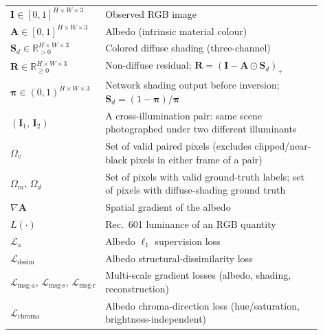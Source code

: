 \begin{longtable}{p{0.25\linewidth} p{0.65\linewidth}}

$\mathbf{I} \in [0,1]^{H \times W \times 3}$
  & Observed RGB image \\

$\mathbf{A} \in [0,1]^{H \times W \times 3}$
  & Albedo (intrinsic material colour) \\

$\mathbf{S}_d \in \mathbb{R}_{>0}^{H \times W \times 3}$
  & Colored diffuse shading (three-channel) \\

$\mathbf{R} \in \mathbb{R}_{\geq 0}^{H \times W \times 3}$
  & Non-diffuse residual; $\mathbf{R} = (\mathbf{I} - \mathbf{A} \odot \mathbf{S}_d)_{+}$ \\

$\boldsymbol{\pi} \in (0,1)^{H \times W \times 3}$
  & Network shading output before inversion; $\mathbf{S}_d = (1-\boldsymbol{\pi})/\boldsymbol{\pi}$ \\

$(\mathbf{I}_1,\, \mathbf{I}_2)$
  & A cross-illumination pair: same scene photographed under two different illuminants \\

$\Omega_v$
  & Set of valid paired pixels (excludes clipped/near-black pixels in either frame of a pair) \\

$\Omega_m,\, \Omega_d$
  & Set of pixels with valid ground-truth labels; set of pixels with diffuse-shading ground truth \\

$\nabla \mathbf{A}$
  & Spatial gradient of the albedo \\

$L(\cdot)$
  & Rec.~601 luminance of an RGB quantity \\

$\mathcal{L}_{\text{a}}$
  & Albedo $\ell_1$ supervision loss \\

$\mathcal{L}_{\text{dssim}}$
  & Albedo structural-dissimilarity loss \\

$\mathcal{L}_{\text{msg-a}},\, \mathcal{L}_{\text{msg-s}},\, \mathcal{L}_{\text{msg-r}}$
  & Multi-scale gradient losses (albedo, shading, reconstruction) \\

$\mathcal{L}_{\text{chroma}}$
  & Albedo chroma-direction loss (hue/saturation, brightness-independent) \\


\end{longtable}
